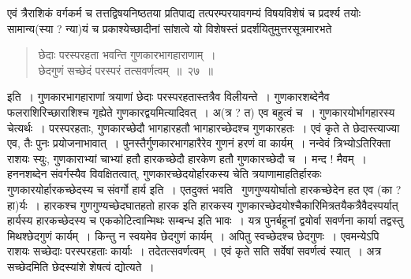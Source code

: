 \documentclass[11pt, openany]{book}
\begin{document}
एवं त्रैराशिकं वर्गकर्म च तत्तद्विषयनिष्ठतया प्रतिपाद्य तत्परम्परयावगम्यं विषयविशेषं च प्रदर्श्य तयोः सामान्य(स्या ? न्या)यं च प्रकाश्येच्छादीनां
सांशत्वे यो विशेषस्तं प्रदर्शयितुमुत्तरसूत्रमारभते\textendash

\begin{quote}
{\ab छेदाः परस्परहता भवन्ति गुणकारभागहाराणाम्~।\\
छेदगुणं सच्छेदं परस्परं तत्सवर्णत्वम्~॥~२७~॥}
\end{quote}

इति~। गुणकारभागहाराणां त्रयाणां छेदाः परस्परहतास्तत्रैव विलीयन्ते~। गुणकारशब्देनैव फलराशिरिच्छाराशिश्च गृह्येते {\qt गुणकारद्वयमि}त्यादिवत्~। अ(त्र ? त) एव बहुत्वं च~। गुणकारयोर्भागहारस्य चेत्यर्थः~। परस्परहताः, गुणकारच्छेदौ भागहारहतौ भागहारच्छेदश्च गुणकारहतः~। एवं कृते ते छेदास्त्याज्या एव, तैः पुनः प्रयोजनाभावात्~। पुनस्तैर्गुणकारभागहारैरेव गुणनं हरणं वा कार्यम्~। नन्वेवं त्रिभ्योऽतिरिक्ता राशयः स्युः, गुणकाराभ्यां चाभ्यां हतौ हारकच्छेदौ हारकेण हतौ गुणकारच्छेदौ च~। मन्द ! मैवम्~। हननशब्देन संवर्गस्यैव विवक्षितत्वात्, गुणकारच्छेदयोर्हारकस्य चेति त्रयाणामाहतिर्हारकः गुणकारयोर्हारकच्छेदस्य च संवर्गो हार्य इति~। एतदुक्तं भवति \textendash\ गुणगुण्ययोर्घातो हारकच्छेदेन हत एव (का ? हा)र्यः~। हारकश्च गुणगुण्यच्छेदघातहतो हारक इति हारकस्य गुणकारच्छेदयोश्चैकारिमित्रतयैकत्रैवैदस्पर्यात् हार्यस्य हारकच्छेदस्य च एककोटित्वान्मिथः सम्बन्ध इति भावः~। यत्र पुनर्बहूनां द्वयोर्वा सवर्णना कार्या तद्वस्तु मिथश्छेदगुणं कार्यम्~। किन्तु न स्वयमेव छेदगुणं कार्यम्~। अपितु स्वच्छेदश्च छेदगुणः~। एवमन्येऽपि राशयः सच्छेदाः परस्परहताः कार्याः~। तदेतत्सवर्णत्वम्~। एवं कृते सति सर्वेषां सवर्णत्वं स्यात्~। अत्र सच्छेदमिति छेदस्यांशे शेषत्वं
द्योत्यते~।

\newpage
\end{document}
